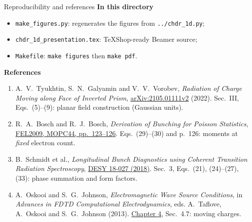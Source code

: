\documentclass[10pt,aspectratio=169]{beamer}
\begin{document}
\begin{frame}{Reproducibility and references}
\textbf{In this directory}
\begin{itemize}
  \item \texttt{make\_figures.py}: regenerates the figures from \texttt{../chdr\_1d.py};
  \item \texttt{chdr\_1d\_presentation.tex}: TeXShop-ready Beamer source;
  \item \texttt{Makefile}: \texttt{make figures} then \texttt{make pdf}.
\end{itemize}
\vspace{0.4em}
\textbf{References}
\begin{enumerate}\footnotesize
  \item A.~V.~Tyukhtin, S.~N.~Galyamin and V.~V.~Vorobev,
  \emph{Radiation of Charge Moving along Face of Inverted Prism},
  \href{https://arxiv.org/abs/2105.01111}{arXiv:2105.01111v2} (2022).
  Sec.~III, Eqs.~(5)--(9): planar field construction (Gaussian units).
  \item R.~A.~Bosch and R.~J.~Bosch,
  \emph{Derivation of Bunching for Poisson Statistics},
  \href{https://proceedings.jacow.org/FEL2009/papers/mopc44.pdf}{FEL2009, MOPC44, pp.~123--126}.
  Eqs.~(29)--(30) and p.~126: moments at \emph{fixed} electron count.
  \item B.~Schmidt et al.,
  \emph{Longitudinal Bunch Diagnostics using Coherent Transition Radiation Spectroscopy},
  \href{https://arxiv.org/abs/1803.00608}{DESY 18-027 (2018)}.
  Sec.~3, Eqs.~(21), (24)--(27), (33): phase summation and form factors.
  \item A.~Oskooi and S.~G.~Johnson,
  \emph{Electromagnetic Wave Source Conditions}, in
  \emph{Advances in FDTD Computational Electrodynamics}, eds.
  A.~Taflove, A.~Oskooi and S.~G.~Johnson (2013).
  \href{https://arxiv.org/abs/1301.5366}{Chapter 4}, Sec.~4.7: moving charges.
\end{enumerate}
\end{frame}
\end{document}
